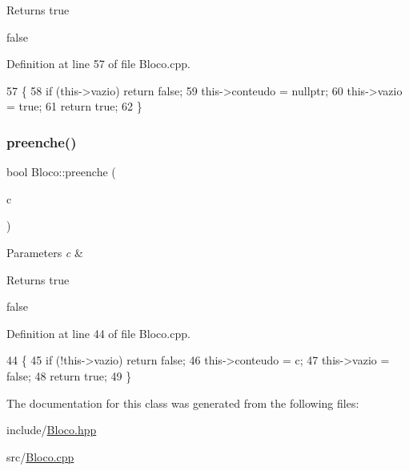\begin{DoxyReturn}{Returns}
true 

false 
\end{DoxyReturn}


Definition at line 57 of file Bloco.\+cpp.


\begin{DoxyCode}
57                   \{
58     \textcolor{keywordflow}{if} (this->vazio) \textcolor{keywordflow}{return} \textcolor{keyword}{false};
59     this->conteudo = \textcolor{keyword}{nullptr};
60     this->vazio = \textcolor{keyword}{true};
61     \textcolor{keywordflow}{return} \textcolor{keyword}{true};
62 \}
\end{DoxyCode}
\mbox{\label{class_bloco_ad5e26f6c5636ac72db653bd1329d5e2e}} 
\subsubsection{\texorpdfstring{preenche()}{preenche()}}
{\footnotesize\ttfamily bool Bloco\+::preenche (\begin{DoxyParamCaption}\item[{\mbox{\hyperlink{class_colocavel_em_bloco}{Colocavel\+Em\+Bloco}} $\ast$}]{c }\end{DoxyParamCaption})}


\begin{DoxyParams}{Parameters}
{\em c} & \\
\hline
\end{DoxyParams}
\begin{DoxyReturn}{Returns}
true 

false 
\end{DoxyReturn}


Definition at line 44 of file Bloco.\+cpp.


\begin{DoxyCode}
44                                         \{
45     \textcolor{keywordflow}{if} (!this->vazio) \textcolor{keywordflow}{return} \textcolor{keyword}{false};
46     this->conteudo = c;
47     this->vazio = \textcolor{keyword}{false};
48     \textcolor{keywordflow}{return} \textcolor{keyword}{true};
49 \}
\end{DoxyCode}


The documentation for this class was generated from the following files\+:\begin{DoxyCompactItemize}
\item 
include/\mbox{\hyperlink{_bloco_8hpp}{Bloco.\+hpp}}\item 
src/\mbox{\hyperlink{_bloco_8cpp}{Bloco.\+cpp}}\end{DoxyCompactItemize}
